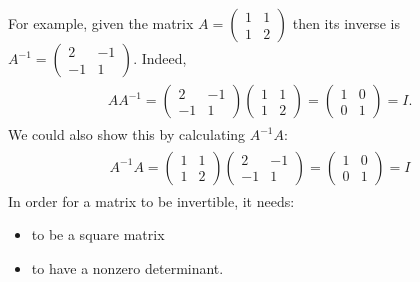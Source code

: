 \documentclass[letterpaper,10pt,english]{jupyterBook}
\begin{document}
\sphinxAtStartPar
For example, given the matrix \(A = \begin{pmatrix} 1 & 1 \\ 1 & 2 \end{pmatrix}\) then its inverse is \(A^{-1} = \begin{pmatrix} 2 & -1 \\ -1 & 1 \end{pmatrix}\). Indeed,
\begin{equation*}
\begin{split} \begin{align*}
    AA^{-1} = \begin{pmatrix} 2 & -1 \\ -1 & 1 \end{pmatrix}\begin{pmatrix} 1 & 1 \\ 1 & 2 \end{pmatrix} = \begin{pmatrix} 1 & 0 \\ 0 & 1 \end{pmatrix} = I.
\end{align*}\end{split}
\end{equation*}
\sphinxAtStartPar
We could also show this by calculating \(A^{-1}A\):
\begin{equation*}
\begin{split} \begin{align*}
    A^{-1}A = \begin{pmatrix} 1 & 1 \\ 1 & 2 \end{pmatrix}\begin{pmatrix} 2 & -1 \\ -1 & 1 \end{pmatrix} = \begin{pmatrix} 1 & 0 \\ 0 & 1 \end{pmatrix} = I
\end{align*}\end{split}
\end{equation*}
\sphinxAtStartPar
In order for a matrix to be invertible, it needs:
\begin{itemize}
\item {} 
\sphinxAtStartPar
to be a square matrix

\item {} 
\sphinxAtStartPar
to have a non\sphinxhyphen{}zero determinant.

\end{itemize}
\end{document}
